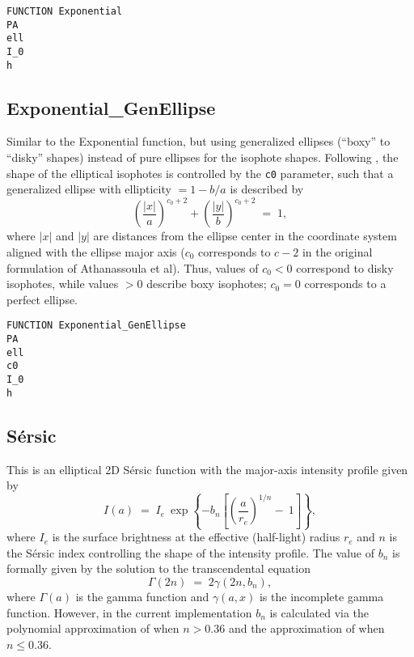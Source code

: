 \documentclass[10pt]{article}
\begin{document}
\begin{verbatim}
FUNCTION Exponential
PA
ell
I_0
h
\end{verbatim}


\subsection{Exponential\_GenEllipse}

Similar to the Exponential function, but using generalized ellipses (``boxy'' to
``disky'' shapes) instead of pure ellipses for the isophote shapes.  Following
\citet{athanassoula90}, the shape of the elliptical isophotes is controlled by
the \texttt{c0} parameter, such that a generalized ellipse with ellipticity $= 1
- b/a$ is described by
\begin{equation}
\left( \frac{|x|}{a} \right)^{c_{0} + 2} + \left( \frac{|y|}{b} \right)^{c_{0} + 2} \; = \; 1,
\end{equation}
where $|x|$ and $|y|$ are distances from the ellipse center in the coordinate system
aligned with the ellipse major axis ($c_{0}$ corresponds to $c - 2$ in the original
formulation of Athanassoula et al).
Thus, values of $c_{0} < 0$ correspond to disky isophotes, while values $> 0$ describe boxy
isophotes; $c_{0} = 0$ corresponds to a perfect ellipse.

\begin{verbatim}
FUNCTION Exponential_GenEllipse
PA
ell
c0
I_0
h
\end{verbatim}


\subsection{S\'ersic}

This is an elliptical 2D S\'ersic function with the major-axis intensity
profile given by
\begin{equation}
I(a) \; = \; I_{e} \: \exp \left\{ -b_{n} \left[ \left( \frac{a}{r_{e}} \right)^{1/n} \! - \: 1 \right] \right\},
\end{equation}
where $I_{e}$ is the surface brightness at the effective (half-light) radius $r_{e}$
and $n$ is the S\'ersic index controlling the shape of the intensity profile. The
value of $b_{n}$ is formally given by the solution to the transcendental equation
\begin{equation}
\Gamma(2 n) \; = \; 2 \gamma(2n, b_{n}),
\end{equation}
where $\Gamma(a)$ is the gamma function and $\gamma(a, x)$ is the incomplete gamma function.
However, in the current implementation $b_{n}$ is calculated via the polynomial approximation
of \citet{ciotti99} when $n > 0.36$ and the approximation of \citet{macarthur03} when
$n \leq 0.36$.
\end{document}
